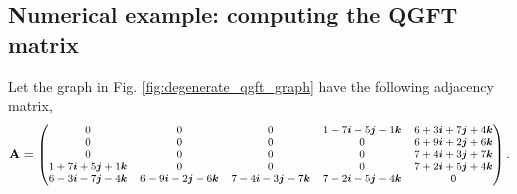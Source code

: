 
\subsection{Numerical example: computing the QGFT matrix}

Let the graph in Fig. \ref{fig:degenerate_qgft_graph} have the following adjacency matrix,
\begin{equation*}
    \footnotesize
    \mathbf{A} = \begin{pmatrix}
        0                   & 0                   & 0                   & 1 -7\boldsymbol{i} -5\boldsymbol{j} -1\boldsymbol{k} & 6 +3\boldsymbol{i} +7\boldsymbol{j} +4\boldsymbol{k} \\
        0                   & 0                   & 0                   & 0                   & 6 +9\boldsymbol{i} +2\boldsymbol{j} +6\boldsymbol{k} \\
        0                   & 0                   & 0                   & 0                   & 7 +4\boldsymbol{i} +3\boldsymbol{j} +7\boldsymbol{k} \\
        1 +7\boldsymbol{i} +5\boldsymbol{j} +1\boldsymbol{k} & 0                   & 0                   & 0                   & 7 +2\boldsymbol{i} +5\boldsymbol{j} +4\boldsymbol{k} \\
        6 -3\boldsymbol{i} -7\boldsymbol{j} -4\boldsymbol{k} & 6 -9\boldsymbol{i} -2\boldsymbol{j} -6\boldsymbol{k} & 7 -4\boldsymbol{i} -3\boldsymbol{j} -7\boldsymbol{k} & 7 -2\boldsymbol{i} -5\boldsymbol{j} -4\boldsymbol{k} & 0                   \\
    \end{pmatrix}.
\end{equation*}

